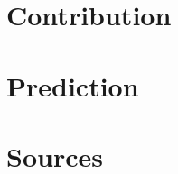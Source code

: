 \documentclass{article}
\begin{document}
\section{Contribution}

\section{Prediction}

\section{Sources}
\end{document}
